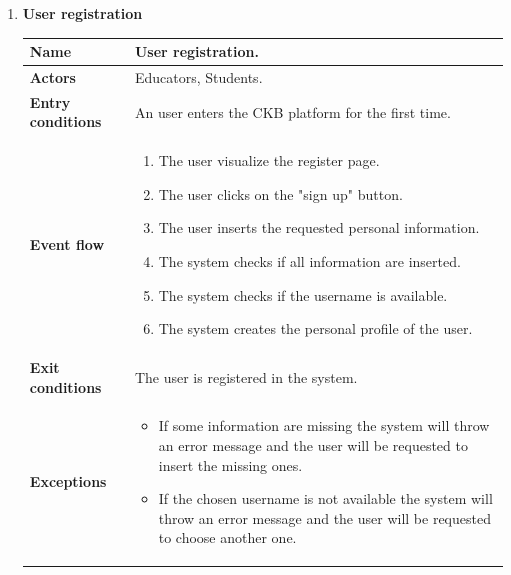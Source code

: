     \begin{enumerate}[label=\textbf{UC.\arabic*}]
        \item {} \textbf{User registration}
        \begin{table}[H]
    	    \centering
                \renewcommand{\arraystretch}{1.5}
                \begin{tabular}{|m{3.2cm}|m{9.8cm}|}
                    \hline
                    \textbf{Name} & User registration. \\
                    \hline
                    \textbf{Actors} & Educators, Students. \\
                    \hline
                    \textbf{Entry conditions}  & An user enters the CKB platform for the first time. \\
                    \hline
                    \textbf{Event flow}  & 
                    \begin{enumerate}[label=\arabic*.]
                        \item The user visualize the register page.
                        \item The user clicks on the "sign up" button.
                        \item The user inserts the requested personal information.
                        \item The system checks if all information are inserted.
                        \item The system checks if the username is available.
                        \item The system creates the personal profile of the user.
                    \end{enumerate}\\
                    \hline
                    \textbf{Exit conditions}  & The user is registered in the system. \\
                    \hline
                    \textbf{Exceptions}  & 
                    \begin{itemize}
                        \item If some information are missing the system will throw an error message and the user will be requested to insert the missing ones.
                        \item If the chosen username is not available the system will throw an error message and the user will be requested to choose another one.
                    \end{itemize} \\

\end{tabular}
\end{table}
\end{enumerate}
